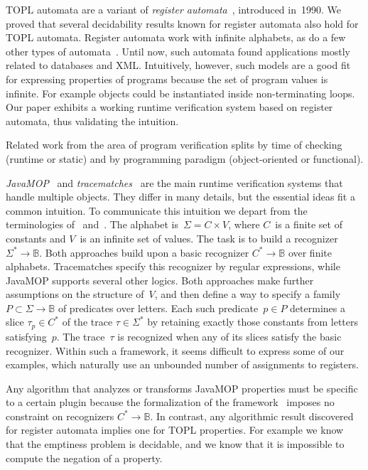 \documentclass[9pt, preprint]{sigplanconf} %
\newcommand{\B}{\ensuremath{\mathbb{B}}}
\theoremstyle{definition}
\theoremstyle{remark}
\begin{document}
TOPL automata are a variant of {\it register automata\/}~\cite{dblp:conf/focs/kaminskif90}, introduced in~1990.
We proved that several decidability results known for register automata also hold for TOPL automata.
Register automata work with infinite alphabets, as do a few other types of automata~\cite{dblp:conf/csl/segoufin06}.
Until now, such automata found applications mostly related to databases and XML\null.
Intuitively, however, such models are a good fit for expressing properties of programs because the set of program values is infinite.
For example objects could be instantiated inside non-terminating loops.
Our paper exhibits a working runtime verification system based on register automata, thus validating the intuition.

Related work from the area of program verification splits by time of checking (runtime or static) and by programming paradigm (object-oriented or functional).

{\it JavaMOP\/}~\cite{dblp:journals/sttt/meredithjgcr12} and {\it tracematches\/}~\cite{dblp:conf/oopsla/allanachklmsst05} are the main runtime verification systems that handle multiple objects.
They differ in many details, but the essential ideas fit a common intuition.
To communicate this intuition we depart from the terminologies of \cite{dblp:journals/sttt/meredithjgcr12}~and~\cite{dblp:conf/oopsla/allanachklmsst05}.
The alphabet is~$\Sigma=C\times V$, where $C$~is a finite set of constants and $V$~is an infinite set of values.
The task is to build a recognizer $\Sigma^*\to\B$.
Both approaches build upon a basic recognizer $C^*\to\B$ over finite alphabets.
Tracematches specify this recognizer by regular expressions, while JavaMOP supports several other logics.
Both approaches make further assumptions on the structure of~$V$, and then define a way to specify a family $P\subset\Sigma\to\B$ of predicates over letters.
Each such predicate~$p\in P$ determines a slice $\tau_p\in C^*$ of the trace $\tau\in\Sigma^*$ by retaining exactly those constants from letters satisfying~$p$.
The trace~$\tau$ is recognized when any of its slices satisfy the basic recognizer.
Within such a framework, it seems difficult to express some of our examples, which naturally use an unbounded number of assignments to registers.

Any algorithm that analyzes or transforms JavaMOP properties must be specific to a certain plugin because the formalization of the framework~\cite{dblp:journals/corr/abs-1112-5761} imposes no constraint on recognizers $C^*\to\B$.
In contrast, any algorithmic result discovered for register automata implies one for TOPL properties.
For example we know that the emptiness problem is decidable, and we know that it is impossible to compute the negation of a property.
\end{document}

